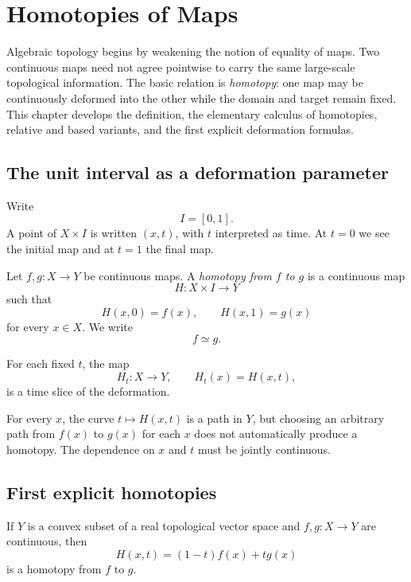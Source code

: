﻿\chapter{Homotopies of Maps}
\label{ch:viii01-homotopies}

Algebraic topology begins by weakening the notion of equality of maps.  Two
continuous maps need not agree pointwise to carry the same large-scale
topological information.  The basic relation is \emph{homotopy}: one map may be
continuously deformed into the other while the domain and target remain fixed.
This chapter develops the definition, the elementary calculus of homotopies,
relative and based variants, and the first explicit deformation formulas.

\section{The unit interval as a deformation parameter}

Write
\[
I=[0,1].
\]
A point of \(X\times I\) is written \((x,t)\), with \(t\) interpreted as time.
At \(t=0\) we see the initial map and at \(t=1\) the final map.

\begin{definition}[Homotopy]
\label{def:viii01-homotopy}
Let \(f,g:X\to Y\) be continuous maps.  A \emph{homotopy from \(f\) to \(g\)}
is a continuous map
\[
H:X\times I\longrightarrow Y
\]
such that
\[
H(x,0)=f(x),
\qquad
H(x,1)=g(x)
\]
for every \(x\in X\).  We write
\[
f\simeq g.
\]
\end{definition}

For each fixed \(t\), the map
\[
H_t:X\to Y,
\qquad
H_t(x)=H(x,t),
\]
is a time slice of the deformation.

\begin{warning}
\label{warn:viii01-pointwise}
For every \(x\), the curve \(t\mapsto H(x,t)\) is a path in \(Y\), but choosing
an arbitrary path from \(f(x)\) to \(g(x)\) for each \(x\) does not automatically
produce a homotopy.  The dependence on \(x\) and \(t\) must be jointly continuous.
\end{warning}

\section{First explicit homotopies}

\begin{example}
\label{ex:viii01-straight}
If \(Y\) is a convex subset of a real topological vector space and
\(f,g:X\to Y\) are continuous, then
\[
H(x,t)=(1-t)f(x)+tg(x)
\]
is a homotopy from \(f\) to \(g\).
\end{example}

